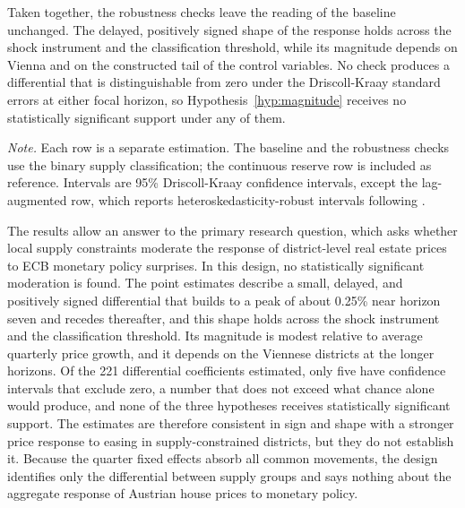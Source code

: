 \documentclass[a4paper,12pt, headsepline]{scrartcl}
\newcommand{\figcap}[2]{\caption[#1]{\textbf{#1}\newline #2}}
\numberwithin{equation}{section}
\begin{document}
Taken together, the robustness checks leave the reading of the baseline unchanged. The delayed, positively signed shape of the response holds across the shock instrument and the classification threshold, while its magnitude depends on Vienna and on the constructed tail of the control variables. No check produces a differential that is distinguishable from zero under the Driscoll-Kraay standard errors at either focal horizon, so Hypothesis~\ref{hyp:magnitude} receives no statistically significant support under any of them.

\begin{table}[H]
	\centering
	\figcap{Differential response across robustness checks at focal horizons}{Response to a one-standard-deviation easing surprise, in percent, at horizons seven and twelve.}\label{tab:robustness-focal}
	

	\vspace{0.2cm}
	\begin{minipage}{0.9\textwidth}
		\footnotesize
		\textit{Note.} Each row is a separate estimation. The baseline and the robustness checks use the binary supply classification; the continuous reserve row is included as reference. Intervals are 95\% Driscoll-Kraay confidence intervals, except the lag-augmented row, which reports heteroskedasticity-robust intervals following \citet{montielolea2021}.
	\end{minipage}
\end{table}

The results allow an answer to the primary research question, which asks whether local supply constraints moderate the response of district-level real estate prices to ECB monetary policy surprises. In this design, no statistically significant moderation is found. The point estimates describe a small, delayed, and positively signed differential that builds to a peak of about 0.25\% near horizon seven and recedes thereafter, and this shape holds across the shock instrument and the classification threshold. Its magnitude is modest relative to average quarterly price growth, and it depends on the Viennese districts at the longer horizons. Of the 221 differential coefficients estimated, only five have confidence intervals that exclude zero, a number that does not exceed what chance alone would produce, and none of the three hypotheses receives statistically significant support. The estimates are therefore consistent in sign and shape with a stronger price response to easing in supply-constrained districts, but they do not establish it. Because the quarter fixed effects absorb all common movements, the design identifies only the differential between supply groups and says nothing about the aggregate response of Austrian house prices to monetary policy.
\end{document}
